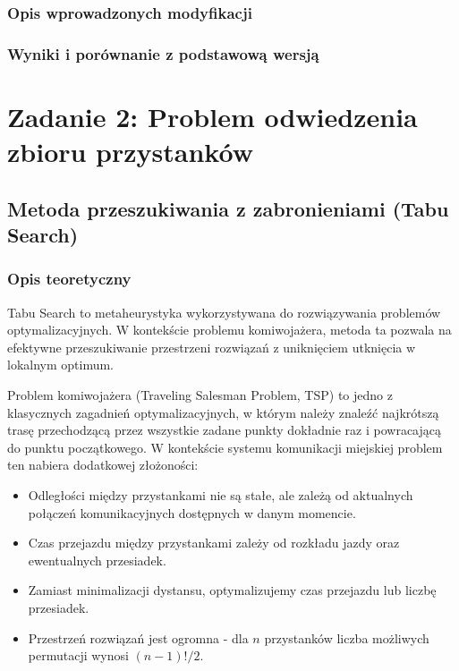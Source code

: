 \documentclass[12pt,a4paper]{article}
\begin{document}
\subsubsection{Opis wprowadzonych modyfikacji}

\subsubsection{Wyniki i porównanie z podstawową wersją}

\section{Zadanie 2: Problem odwiedzenia zbioru przystanków}
\subsection{Metoda przeszukiwania z zabronieniami (Tabu Search)}
\subsubsection{Opis teoretyczny}
Tabu Search to metaheurystyka wykorzystywana do rozwiązywania problemów optymalizacyjnych. W kontekście problemu komiwojażera, metoda ta pozwala na efektywne przeszukiwanie przestrzeni rozwiązań z uniknięciem utknięcia w lokalnym optimum.

Problem komiwojażera (Traveling Salesman Problem, TSP) to jedno z klasycznych zagadnień optymalizacyjnych, w którym należy znaleźć najkrótszą trasę przechodzącą przez wszystkie zadane punkty dokładnie raz i powracającą do punktu początkowego. W kontekście systemu komunikacji miejskiej problem ten nabiera dodatkowej złożoności:

\begin{itemize}
    \item Odległości między przystankami nie są stałe, ale zależą od aktualnych połączeń komunikacyjnych dostępnych w danym momencie.
    \item Czas przejazdu między przystankami zależy od rozkładu jazdy oraz ewentualnych przesiadek.
    \item Zamiast minimalizacji dystansu, optymalizujemy czas przejazdu lub liczbę przesiadek.
    \item Przestrzeń rozwiązań jest ogromna - dla $n$ przystanków liczba możliwych permutacji wynosi $(n-1)!/2$.
\end{itemize}
\end{document}
